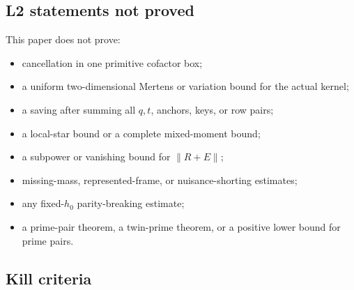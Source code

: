 \subsection{L2 statements not proved}

This paper does not prove:
\begin{itemize}
 \item cancellation in one primitive cofactor box;
 \item a uniform two-dimensional Mertens or variation bound for the actual
       kernel;
 \item a saving after summing all \(q,t\), anchors, keys, or row pairs;
 \item a local-star bound or a complete mixed-moment bound;
 \item a subpower or vanishing bound for \(\|R+E\|\);
 \item missing-mass, represented-frame, or nuisance-shorting estimates;
 \item any fixed-\(h_0\) parity-breaking estimate;
 \item a prime-pair theorem, a twin-prime theorem, or a positive lower
       bound for prime pairs.
\end{itemize}

\subsection{Kill criteria}

